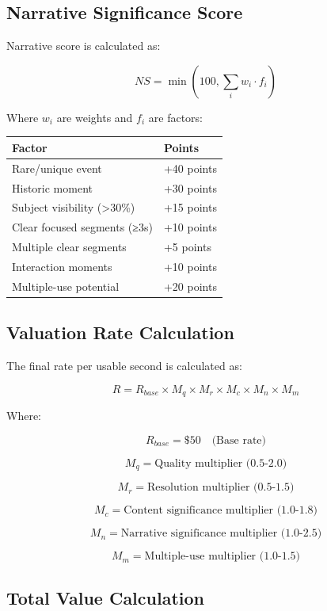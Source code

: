 \documentclass[
  11pt,
]{article}
\begin{document}
\hypertarget{narrative-significance-score}{%
\subsection{Narrative Significance
Score}\label{narrative-significance-score}}

Narrative score is calculated as:

\[NS = \min(100, \sum_{i} w_i \cdot f_i)\]

Where \(w_i\) are weights and \(f_i\) are factors:

\begin{longtable}[]{@{}ll@{}}
\toprule\noalign{}
Factor & Points \\
\midrule\noalign{}
\endhead
\bottomrule\noalign{}
\endlastfoot
Rare/unique event & +40 points \\
Historic moment & +30 points \\
Subject visibility (\textgreater30\%) & +15 points \\
Clear focused segments (≥3s) & +10 points \\
Multiple clear segments & +5 points \\
Interaction moments & +10 points \\
Multiple-use potential & +20 points \\
\end{longtable}

\hypertarget{valuation-rate-calculation}{%
\subsection{Valuation Rate
Calculation}\label{valuation-rate-calculation}}

The final rate per usable second is calculated as:

\[R = R_{base} \times M_q \times M_r \times M_c \times M_n \times M_m\]

Where:

\[R_{base} = \$50 \quad \text{(Base rate)}\]

\[M_q = \text{Quality multiplier (0.5-2.0)}\]

\[M_r = \text{Resolution multiplier (0.5-1.5)}\]

\[M_c = \text{Content significance multiplier (1.0-1.8)}\]

\[M_n = \text{Narrative significance multiplier (1.0-2.5)}\]

\[M_m = \text{Multiple-use multiplier (1.0-1.5)}\]

\hypertarget{total-value-calculation}{%
\subsection{Total Value Calculation}\label{total-value-calculation}}
\end{document}
